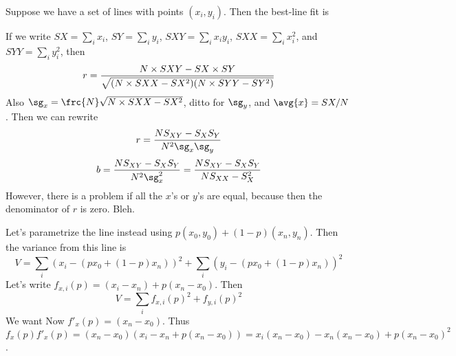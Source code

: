 \documentclass{article}
\begin{document}
Suppose we have a set of lines with points $(x_i,y_i)$.  Then the best-line fit is

If we write $SX=\sum_ix_i$, $SY=\sum_iy_i$, $SXY=\sum_ix_iy_i$, $SXX = \sum_ix_i^2$, and $SYY = \sum_iy_i^2$, then 
$$r = {N\times SXY - SX\times SY\over\sqrt{(N\times SXX - SX^2)(N\times SYY - SY^2)}}$$
Also $\sg_x = \frc{N}\sqrt{N\times SXX - SX^2}$, ditto for $\sg_y$, and $\avg{x} = SX/N$.  Then we can rewrite
$$r={NS_{XY} - S_X S_Y\over N^2\sg_x\sg_y}$$
$$b = {NS_{XY} - S_X S_Y\over N^2\sg_x^2} = {NS_{XY}-S_XS_Y\over NS_{XX}-S_X^2}$$
However, there is a problem if all the $x$'s or $y$'s are equal, because then the denominator of $r$ is zero.  Bleh.

Let's parametrize the line instead using $p(x_0,y_0)+(1-p)(x_n,y_n)$.  Then the variance from this line is 
$$V = \sum_i (x_i-(px_0 + (1-p)x_n))^2 + \sum_i (y_i - (px_0 + (1-p)x_n))^2$$
Let's write $f_{x,i}(p) = (x_i - x_n) + p(x_n-x_0)$.  Then
$$V = \sum_i f_{x,i}(p)^2 + f_{y,i}(p)^2$$
We want
Now $f'_x (p) = (x_n-x_0)$.  Thus $f_x(p)f'_x(p) = (x_n-x_0)(x_i-x_n+p(x_n-x_0)) = x_i(x_n-x_0) - x_n(x_n-x_0) + p(x_n-x_0)^2$.  
\end{document}
